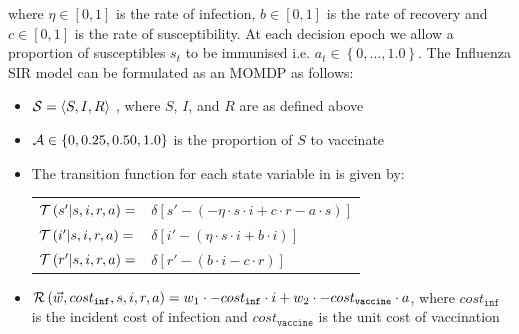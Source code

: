 where {\footnotesize $ \eta \in [0, 1]$} is the rate of infection, {\footnotesize $ b \in [0, 1]$} is the rate of recovery and {\footnotesize $ c \in [0, 1]$} is the rate of susceptibility. At each decision epoch we allow a proportion of susceptibles {\footnotesize $ s_t $} to be immunised i.e. {\footnotesize $ a_t \in \left\lbrace 0, \ldots, 1.0\right\rbrace $}. The Influenza SIR model can be formulated as an MOMDP as follows:

\begin{itemize}
    \item {\footnotesize $ \mathcal{S} = \left\langle S, I, R \right\rangle$ }, where $ S $, $ I $, and $ R $ are as defined above
    \item {\footnotesize $ \mathcal{A} \in \left\lbrace 0, 0.25, 0.50, 1.0 \right\rbrace $} is the proportion of $ S $ to vaccinate
    \item The transition function {\footnotesize \Transition} for each state variable in {\footnotesize \State} is given by:    
    {\footnotesize 
        \abovedisplayskip=5pt
        \belowdisplayskip=0pt
        \renewcommand{\arraystretch}{1.5}
        \begin{tabular}{ll}
            $ \mathcal{T}\left( s' | s, i, r, a \right) =$ & $ \delta \left[ s' - (- \eta \cdot s \cdot i + c \cdot r -a \cdot s) \right] $ \\
            $ \mathcal{T}\left( i' | s, i, r, a \right) =$ & $ \delta \left[ i' - (\eta \cdot s \cdot i + b \cdot i) \right] $ \\
            $ \mathcal{T}\left( r' | s, i, r, a \right) =$ & $ \delta \left[ r' - (b \cdot i - c \cdot r) \right] $ \\            
        \end{tabular}
    }%
    \item {\footnotesize $ \mathcal{R}\left(\vec{w}, cost_{\mathtt{inf}}, s, i, r, a \right) = w_1 \cdot -cost_{\mathtt{inf}} \cdot i + w_2 \cdot -cost_{\mathtt{vaccine}} \cdot a $}, where {\footnotesize $ cost_{\mathtt{inf}} $} is the incident cost of infection and {\footnotesize $ cost_{\mathtt{vaccine}} $} is the unit cost of vaccination \\
\end{itemize} 
    
